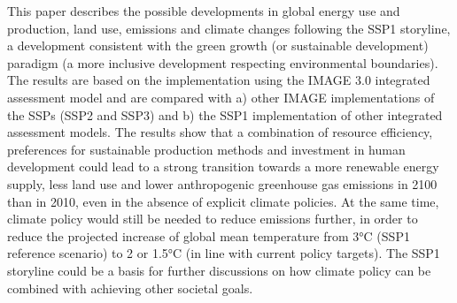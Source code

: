 This paper describes the possible developments in global energy use and production, land use, emissions and climate changes following the SSP1 storyline, a development consistent with the green growth (or sustainable development) paradigm (a more inclusive development respecting environmental boundaries). The results are based on the implementation using the IMAGE 3.0 integrated assessment model and are compared with a) other IMAGE implementations of the SSPs (SSP2 and SSP3) and b) the SSP1 implementation of other integrated assessment models. The results show that a combination of resource efficiency, preferences for sustainable production methods and investment in human development could lead to a strong transition towards a more renewable energy supply, less land use and lower anthropogenic greenhouse gas emissions in 2100 than in 2010, even in the absence of explicit climate policies. At the same time, climate policy would still be needed to reduce emissions further, in order to reduce the projected increase of global mean temperature from 3°C (SSP1 reference scenario) to 2 or 1.5°C (in line with current policy targets). The SSP1 storyline could be a basis for further discussions on how climate policy can be combined with achieving other societal goals.